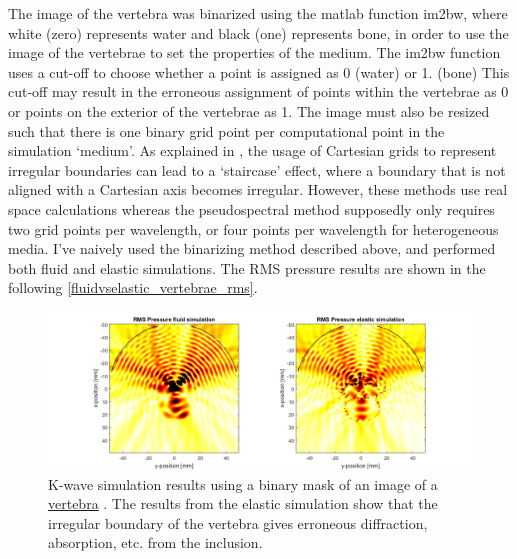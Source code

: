 \documentclass[10pt,a4paper]{article}
\begin{document}
The image of the vertebra was binarized using the matlab function im2bw, where white (zero) represents water and black (one) represents bone, in order to use the image of the vertebrae to set the properties of the medium. The im2bw function uses a cut-off to choose whether a point is assigned as 0 (water) or 1. (bone) This cut-off may result in the erroneous assignment of points within the vertebrae as 0 or points on the exterior of the vertebrae as 1. The image must also be resized such that there is one binary grid point per computational point in the simulation `medium'. As explained in \cite{muir1992modeling,vafaeian2014finite}, the usage of Cartesian grids to represent irregular boundaries can lead to a `staircase' effect, where a boundary that is not aligned with a Cartesian axis becomes irregular. However, these methods use real space calculations whereas the pseudospectral method supposedly only requires two grid points per wavelength, or four points per wavelength for heterogeneous media. I've naively used the binarizing method described above, and performed both fluid and elastic simulations. The RMS pressure results are shown in the following \autoref{fluidvselastic_vertebrae_rms}.

\begin{figure}[H]
\hspace*{-4cm}
\includegraphics[scale=0.7]{fluidvselastic_vertebrae_rms}
\caption{K-wave simulation results using a binary mask of an image of a \href{https://www.cedars-sinai.edu/Patients/Programs-and-Services/Spine-Center/The-Patient-Guide/Anatomy-of-the-Spine/Vertebrae-of-the-Spine.aspx}{vertebra} . The results from the elastic simulation show that the irregular boundary of the vertebra gives erroneous diffraction, absorption, etc. from the inclusion.}\label{fluidvselastic_vertebrae_rms}
\end{figure} 
\end{document}

